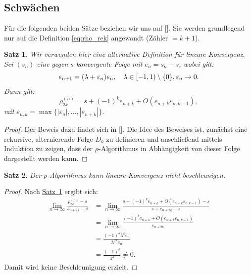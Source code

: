 \documentclass[a4paper,12pt]{article}
\numberwithin{equation}{section}
\newcommand{\sref}[1]{\hyperref[#1]{Satz~\ref*{#1}}}
\newtheorem{satz}{Satz}[section]
\theoremstyle{remark}
\begin{document}
\subsection{Schwächen}\label{subsec:schwächen}
Für die folgenden beiden Sätze beziehen wir uns auf [\cite[526-527]{osada1996acceleration}]. Sie werden grundlegend nur auf die Definition \eqref{eq:rho_rek} angewandt (Zähler $= k+1$).
\begin{satz}\label{satz3}
\textnormal{Wir verwenden hier eine alternative Definition für lineare Konvergenz.}
\textit{Sei $(s_n)$ eine gegen $s$ konvergente Folge mit $e_n = s_n - s$, wobei gilt:
\[
e_{n+1} = (\lambda + \varepsilon_n)e_n, \quad \lambda\in[-1,1)\setminus\{0\}, \space \varepsilon_n \to 0.
\]
Dann gilt:
\[
\rho^{(n)}_{2k} = s + (-1)^k e_{n+k} + O(e_{n+k} \varepsilon_{n,k-1}),
\]
mit $\varepsilon_{n,k} = \max\{ |\varepsilon_n|, \ldots, |\varepsilon_{n+k}| \}$.}
\end{satz}
\begin{proof}
Der Beweis dazu findet sich in [\cite[526-527]{osada1996acceleration}]. Die Idee des Beweises ist, zunächst eine rekursive, alternierende Folge $D_k$ zu definieren und anschließend mittels Induktion zu zeigen, dass der $\rho$-Algorithmus in Abhängigkeit von dieser Folge dargestellt werden kann.
\end{proof}

\begin{satz}\label{satz4}
\textit{Der $\rho$-Algorithmus kann lineare Konvergenz nicht beschleunigen.}
\end{satz}

\begin{proof}
Nach \sref{satz3} ergibt sich:
\begin{align*}
    \lim_{n \to \infty} \frac{ \rho^{(n)}_{2k} - s }{ s_{n+2k} - s } &= \lim_{n \to \infty} \frac{ s + (-1)^k e_{n+k} + O(e_{n+k} \varepsilon_{n,k-1}) - s }{ s + e_{n+2k} - s } \\
&=\lim_{n \to \infty} \frac{(-1)^k e_{n+k} + O(e_{n+k} \varepsilon_{n,k-1})}{e_{n+2k}} \\
&=\frac{(-1)^k\lambda^k e_{n}}{\lambda^{2k}e_{n}} \\
&=\frac{(-1)^k}{\lambda^k} \ne 0.
\end{align*}
Damit wird keine Beschleunigung erzielt.

\end{proof}
\newpage
\end{document}
